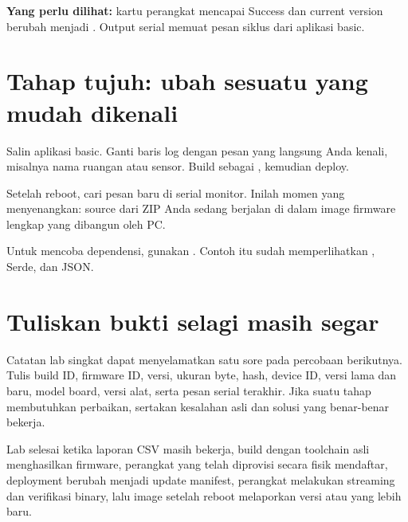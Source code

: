 \textbf{Yang perlu dilihat:} kartu perangkat mencapai Success dan current version berubah menjadi . Output serial memuat pesan siklus dari aplikasi basic.

\section{Tahap tujuh: ubah sesuatu yang mudah dikenali}

Salin aplikasi basic. Ganti baris log dengan pesan yang langsung Anda kenali, misalnya nama ruangan atau sensor. Build sebagai , kemudian deploy.

Setelah reboot, cari pesan baru di serial monitor. Inilah momen yang menyenangkan: source dari ZIP Anda sedang berjalan di dalam image firmware lengkap yang dibangun oleh PC.

Untuk mencoba dependensi, gunakan . Contoh itu sudah memperlihatkan , Serde, dan JSON.

\section{Tuliskan bukti selagi masih segar}

Catatan lab singkat dapat menyelamatkan satu sore pada percobaan berikutnya. Tulis build ID, firmware ID, versi, ukuran byte, hash, device ID, versi lama dan baru, model board, versi alat, serta pesan serial terakhir. Jika suatu tahap membutuhkan perbaikan, sertakan kesalahan asli dan solusi yang benar-benar bekerja.

\begin{checkpoint}
Lab selesai ketika laporan CSV masih bekerja, build dengan toolchain asli menghasilkan firmware, perangkat yang telah diprovisi secara fisik mendaftar, deployment berubah menjadi update manifest, perangkat melakukan streaming dan verifikasi binary, lalu image setelah reboot melaporkan versi  atau yang lebih baru.
\end{checkpoint}
